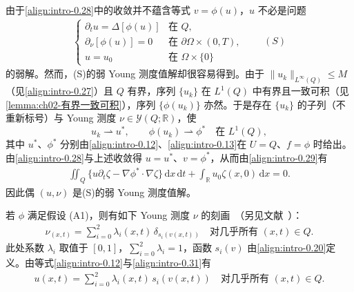 \documentclass[../main.tex]{subfiles}
\begin{document}
由于\eqref{align:intro-0.28}中的收敛并不蕴含等式 $v=\phi(u)$，$u$ 不必是问题
\begin{align*}
\begin{cases}
\partial_t u = \Delta[\phi(u)] & \text{在 }Q,\\
\partial_\nu[\phi(u)] = 0 & \text{在 }\partial\Omega\times(0,T),\\
u=u_0 & \text{在 }\Omega\times\{0\}
\end{cases}
\qquad(S)
\end{align*}
的弱解。然而，(S)的弱 Young 测度值解却很容易得到。由于 $\|u_k\|_{L^\infty(Q)}\leqslant M$（见\eqref{align:intro-0.27}）且 $Q$ 有界，序列 $\{u_k\}$ 在 $L^1(Q)$ 中有界且一致可积（见\cref{lemma:ch02-有界一致可积}），序列 $\{\phi(u_k)\}$ 亦然。于是存在 $\{u_k\}$ 的子列（不重新标号）与 Young 测度 $\nu\in\mathcal{Y}(Q;\mathbb{R})$，使
\[
u_k\rightharpoonup u^*,\qquad \phi(u_k)\rightharpoonup\phi^* \quad \text{在 }L^1(Q),
\]
其中 $u^*$、$\phi^*$ 分别由\eqref{align:intro-0.12}、\eqref{align:intro-0.13}在 $U=Q$、$f=\phi$ 时给出。由\eqref{align:intro-0.28}与上述收敛得 $u=u^*$、$v=\phi^*$，从而由\eqref{align:intro-0.29}有
\begin{align}
\iint_Q\{u\partial_t\zeta - \nabla\phi^*\cdot\nabla\zeta\}\,\mathrm{d}x\,\mathrm{d}t
+ \int_{\mathbb{R}}u_0\zeta(x,0)\,\mathrm{d}x = 0. \label{align:intro-0.30}
\end{align}
因此偶 $(u,\nu)$ 是(S)的弱 Young 测度值解。

若 $\phi$ 满足假设 (A1)，则有如下 Young 测度 $\nu$ 的刻画~\cite{ref83}（另见文献~\cite{ref82,ref84}）：
\begin{align}
\nu_{(x,t)} = \sum_{i=0}^2 \lambda_i(x,t)\,\delta_{s_i(v(x,t))}
\quad \text{对几乎所有 }(x,t)\in Q. \label{align:intro-0.31}
\end{align}
此处系数 $\lambda_i$ 取值于 $[0,1]$，$\sum_{i=0}^2\lambda_i=1$，函数 $s_i(v)$ 由\eqref{align:intro-0.20}定义。由等式\eqref{align:intro-0.12}与\eqref{align:intro-0.31}有
\begin{align}
u(x,t) = \sum_{i=0}^2\lambda_i(x,t)\,s_i(v(x,t))
\quad \text{对几乎所有 }(x,t)\in Q. \label{align:intro-0.32}
\end{align}
\end{document}
